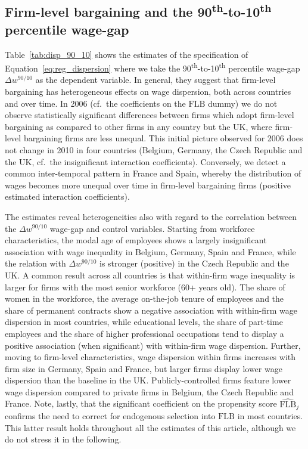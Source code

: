 \documentclass[12pt]{article}
\begin{document}
\subsection{Firm-level bargaining and the 90\textsuperscript{th}-to-10\textsuperscript{th} percentile wage-gap}


Table~\ref{tab:disp_90_10} shows the estimates of the specification of
Equation~\ref{eq:reg_dispersion} where we take the
90\textsuperscript{th}-to-10\textsuperscript{th} percentile wage-gap
$\Delta w^{90/10}$ as the dependent variable. In general, they suggest
that firm-level bargaining has heterogeneous effects on wage
dispersion, both across countries and over time. In 2006 (cf.~the
coefficients on the $\mathrm{FLB}$ dummy) we do not observe
statistically significant differences between firms which adopt
firm-level bargaining as compared to other firms in any country but
the UK, where firm-level bargaining firms are less unequal. This
initial picture observed for 2006 does not change in 2010 in four
countries (Belgium, Germany, the Czech Republic and the UK, cf.~the
insignificant interaction coefficients).  Conversely, we detect a
common inter-temporal pattern in France and Spain, whereby the
distribution of wages becomes more unequal over time in firm-level
bargaining firms (positive estimated interaction coefficients).

The estimates reveal heterogeneities also with regard to the
correlation between the $\Delta w^{90/10}$ wage-gap and control
variables. Starting from workforce characteristics, the modal age of
employees shows a largely insignificant association with wage
inequality in Belgium, Germany, Spain and France, while the relation
with $\Delta w^{90/10}$ is stronger (positive) in the Czech Republic
and the UK. A common result across all countries is that within-firm
wage inequality is larger for firms with the most senior workforce
(60+ years old). The share of women in the workforce, the average
on-the-job tenure of employees and the share of permanent contracts
show a negative association with within-firm wage dispersion in most
countries, while educational levels, the share of part-time employees
and the share of higher professional occupations tend to display a
positive association (when significant) with within-firm wage
dispersion. Further, moving to firm-level characteristics, wage
dispersion within firms increases with firm size in Germany, Spain and
France, but larger firms display lower wage dispersion than the
baseline in the UK. Publicly-controlled firms feature lower wage
dispersion compared to private firms in Belgium, the Czech Republic
and France. Note, lastly, that the significant coefficient on the
propensity score $\widehat{\mathrm{FLB}}_j$ confirms the need to
correct for endogenous selection into $\mathrm{FLB}$ in most
countries. This latter result holds throughout all the estimates of
this article, although we do not stress it in the following.\\
\end{document}
